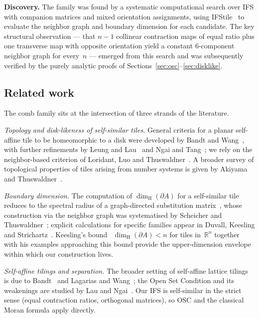 \documentclass{amsart}
\theoremstyle{definition}
\theoremstyle{remark}
\newcommand{\R}{\mathbb{R}}
\newcommand{\dH}{\dim_{\mathrm{H}}}
\begin{document}
\textbf{Discovery.}
The family was found by a systematic computational search over IFS with
companion matrices and mixed orientation assignments, using
IFStile~\cite{ifstile} to evaluate the neighbor graph and boundary
dimension for each candidate.  The key structural observation --- that
$n{-}1$ collinear contraction maps of equal ratio plus one transverse
map with opposite orientation yield a constant $6$-component neighbor
graph for every~$n$ --- emerged from this search and was subsequently
verified by the purely analytic proofs of
Sections~\ref{sec:osc}--\ref{sec:disklike}.

\subsection*{Related work}

The comb family sits at the intersection of three strands of the
literature.

\emph{Topology and disk-likeness of self-similar tiles.}
General criteria for a planar self-affine tile to be homeomorphic to
a disk were developed by Bandt and Wang~\cite{bandt-wang}, with
further refinements by Leung and Lau~\cite{leung-lau} and Ngai and
Tang~\cite{ngai-tang}; we rely on the neighbor-based criterion of
Loridant, Luo and Thuswaldner~\cite{loridant-luo-thuswaldner}.
A broader survey of topological properties of tiles arising from
number systems is given by Akiyama and
Thuswaldner~\cite{akiyama-thuswaldner}.

\emph{Boundary dimension.}
The computation of $\dH(\partial A)$ for a self-similar tile reduces
to the spectral radius of a graph-directed substitution
matrix~\cite{mauldin-williams}, whose construction via the neighbor
graph was systematised by Scheicher and
Thuswaldner~\cite{scheicher-thuswaldner}; explicit calculations for
specific families appear in Duvall, Keesling and
Strichartz~\cite{duvall-keesling-strichartz}.  Keesling's
bound~\cite{keesling} $\dH(\partial A) < n$ for tiles in~$\R^n$
together with his examples approaching this bound provide the
upper-dimension envelope within which our construction lives.

\emph{Self-affine tilings and separation.}
The broader setting of self-affine lattice tilings is due to
Bandt~\cite{bandt1991} and Lagarias and Wang~\cite{lagarias-wang};
the Open Set Condition and its weakenings are studied by Lau and
Ngai~\cite{lau-ngai}.  Our IFS is self-similar in the strict sense
(equal contraction ratios, orthogonal matrices), so OSC and the
classical Moran formula apply directly.
\end{document}
